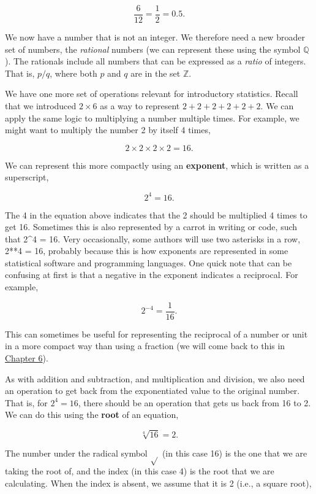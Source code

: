 \documentclass[
]{scrbook}
\begin{document}
\[\frac{6}{12} = \frac{1}{2} = 0.5.\]

We now have a number that is not an integer.
We therefore need a new broader set of numbers, the \emph{rational} numbers (we can represent these using the symbol \(\mathbb{Q}\)).
The rationals include all numbers that can be expressed as a \emph{ratio} of integers.
That is, \(p / q\), where both \(p\) and \(q\) are in the set \(\mathbb{Z}\).

We have one more set of operations relevant for introductory statistics.
Recall that we introduced \(2 \times 6\) as a way to represent \(2 + 2 + 2 + 2 + 2 + 2\).
We can apply the same logic to multiplying a number multiple times.
For example, we might want to multiply the number 2 by itself 4 times,

\[2 \times 2 \times 2 \times 2 = 16.\]

We can represent this more compactly using an \textbf{exponent}, which is written as a superscript,

\[2^{4} = 16.\]

The 4 in the equation above indicates that the 2 should be multiplied 4 times to get 16.
Sometimes this is also represented by a carrot in writing or code, such that 2\^{}4 = 16.
Very occasionally, some authors will use two asterisks in a row, 2**4 = 16, probably because this is how exponents are represented in some statistical software and programming languages.
One quick note that can be confusing at first is that a negative in the exponent indicates a reciprocal.
For example,

\[2^{-4} = \frac{1}{16}.\]

This can sometimes be useful for representing the reciprocal of a number or unit in a more compact way than using a fraction (we will come back to this in \protect\hyperlink{Chapter_6}{Chapter 6}).

As with addition and subtraction, and multiplication and division, we also need an operation to get back from the exponentiated value to the original number.
That is, for \(2^{4} = 16\), there should be an operation that gets us back from 16 to 2.
We can do this using the \textbf{root} of an equation,

\[\sqrt[4]{16} = 2.\]

The number under the radical symbol \(\sqrt{}\) (in this case 16) is the one that we are taking the root of, and the index (in this case 4) is the root that we are calculating.
When the index is absent, we assume that it is 2 (i.e., a square root),
\end{document}
